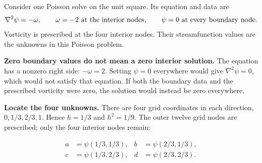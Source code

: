 Consider one Poisson solve on the unit square. Its equation and data are
\[
\nabla^2\psi=-\omega,\qquad
\omega=-2\ \hbox{at the interior nodes},\qquad
\psi=0\ \hbox{at every boundary node}.
\]
Vorticity is prescribed at the four interior nodes. Their streamfunction
values are the unknowns in this Poisson problem.

\textbf{Zero boundary values do not mean a zero interior solution.}
The equation has a nonzero right side: $-\omega=2$. Setting $\psi=0$
everywhere would give $\nabla^2\psi=0$, which would not satisfy that equation.
If both the boundary data and the prescribed vorticity were zero, the solution
would instead be zero everywhere.

\textbf{Locate the four unknowns.} There are four grid coordinates in each
direction, $0,1/3,2/3,1$. Hence $h=1/3$ and $h^2=1/9$.
The outer twelve grid nodes are prescribed; only the four interior nodes remain:
\begin{center}
\end{center}
\[
\begin{aligned}
a&=\psi(1/3,1/3),& b&=\psi(2/3,1/3),\\
c&=\psi(1/3,2/3),& d&=\psi(2/3,2/3).
\end{aligned}
\]

